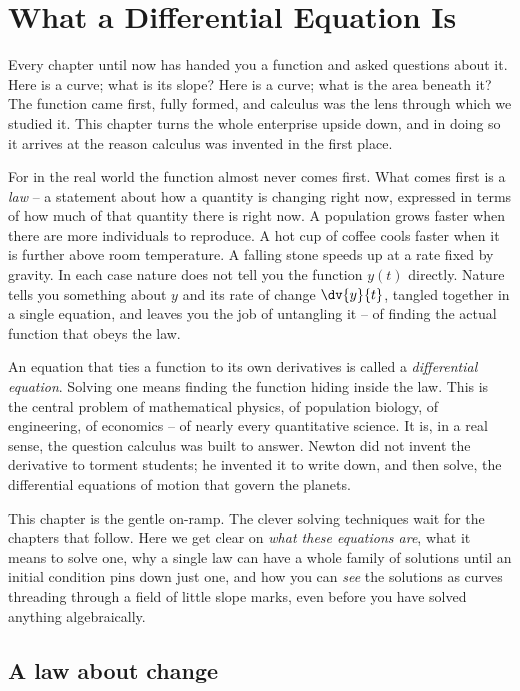 \chapter{What a Differential Equation Is}

Every chapter until now has handed you a function and asked questions about it. Here is a curve; what is its slope? Here is a curve; what is the area beneath it? The function came first, fully formed, and calculus was the lens through which we studied it. This chapter turns the whole enterprise upside down, and in doing so it arrives at the reason calculus was invented in the first place.

For in the real world the function almost never comes first. What comes first is a \emph{law} -- a statement about how a quantity is changing right now, expressed in terms of how much of that quantity there is right now. A population grows faster when there are more individuals to reproduce. A hot cup of coffee cools faster when it is further above room temperature. A falling stone speeds up at a rate fixed by gravity. In each case nature does not tell you the function $y(t)$ directly. Nature tells you something about $y$ and its rate of change $\dv{y}{t}$, tangled together in a single equation, and leaves you the job of untangling it -- of finding the actual function that obeys the law.

An equation that ties a function to its own derivatives is called a \emph{differential equation}. Solving one means finding the function hiding inside the law. This is the central problem of mathematical physics, of population biology, of engineering, of economics -- of nearly every quantitative science. It is, in a real sense, the question calculus was built to answer. Newton did not invent the derivative to torment students; he invented it to write down, and then solve, the differential equations of motion that govern the planets.

This chapter is the gentle on-ramp. The clever solving techniques wait for the chapters that follow. Here we get clear on \emph{what these equations are}, what it means to solve one, why a single law can have a whole family of solutions until an initial condition pins down just one, and how you can \emph{see} the solutions as curves threading through a field of little slope marks, even before you have solved anything algebraically.

\section{A law about change}
\label{ch36:sec-law}

